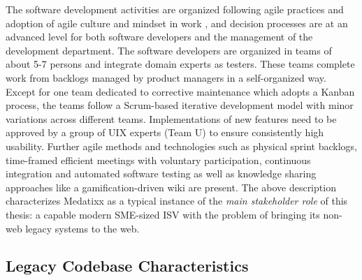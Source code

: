 The software development activities are organized following agile practices and adoption of agile culture and mindset in work , and decision processes are at an advanced level for both software developers and the management of the development department.
The software developers are organized in teams of about 5-7 persons and integrate domain experts as testers.
These teams complete work from backlogs managed by product managers in a self-organized way.
Except for one team dedicated to corrective maintenance which adopts a Kanban \autocite{Anderson2010Kanban} process, the teams follow a Scrum-based \autocite{Beedle2002Scrum} iterative development model with minor variations across different teams.
Implementations of new features need to be approved by a group of UIX experts (Team U) to ensure consistently high usability.
Further agile methods and technologies such as physical sprint backlogs, time-framed efficient meetings with voluntary participation, continuous integration and automated software testing as well as knowledge sharing approaches like a gamification-driven wiki are present.
The above description characterizes Medatixx as a typical instance of the \emph{main stakeholder role} of this thesis: a capable modern SME-sized ISV with the problem of bringing its non-web legacy systems to the web.

\hypertarget{sec:scenario-code}{%
\subsection{Legacy Codebase Characteristics}\label{sec:scenario-code}}

